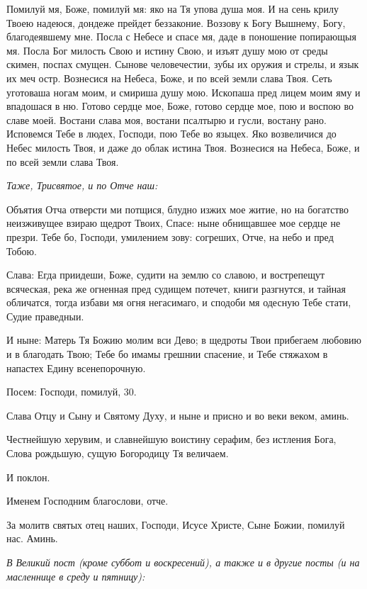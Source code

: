

Помилуй мя, Боже, помилуй мя: яко на Тя упова душа моя. И на сень крилу Твоею надеюся, дондеже прейдет беззаконие. Воззову к Богу Вышнему, Богу, благодеявшему мне. Посла с Небесе и спасе мя, даде в поношение попирающыя мя. Посла Бог милость Свою и истину Свою, и изъят душу мою от среды скимен, поспах смущен. Сынове человечестии, зубы их оружия и стрелы, и язык их меч остр. Вознесися на Небеса, Боже, и по всей земли слава Твоя. Сеть уготоваша ногам моим, и смириша душу мою. Ископаша пред лицем моим яму и впадошася в ню. Готово сердце мое, Боже, готово сердце мое, пою и воспою во славе моей. Востани слава моя, востани псалтырю и гусли, востану рано. Исповемся Тебе в людех, Господи, пою Тебе во языцех. Яко возвеличися до Небес милость Твоя, и даже до облак истина Твоя. Вознесися на Небеса, Боже, и по всей земли слава Твоя.


\itshape Таже, Трисвятое, и по Отче наш:\normalfont{}




Объятия Отча отверсти ми потщися, блудно изжих мое житие, но на богатство неизживущее взираю щедрот Твоих, Спасе: ныне обнищавшее мое сердце не презри. Тебе бо, Господи, умилением зову: согреших, Отче, на небо и пред Тобою.


Слава: Егда приидеши, Боже, судити на землю со славою, и вострепещут всяческая, река же огненная пред судищем потечет, книги разгнутся, и тайная обличатся, тогда избави мя огня негасимаго, и сподоби мя одесную Тебе стати, Судие праведныи.


И ныне: Матерь Тя Божию молим вси Дево; в щедроты Твои прибегаем любовию и в благодать Твою; Тебе бо имамы грешнии спасение, и Тебе стяжахом в напастех Едину всенепорочную.


Посем: Господи, помилуй, 30.

Слава Отцу и Сыну и Святому Духу, и ныне и присно и во веки веком, аминь.

Честнейшую херувим, и славнейшую воистину серафим, без истления Бога, Слова рождьшую, сущую Богородицу Тя величаем.

И поклон.

Именем Господним благослови, отче.

За молитв святых отец наших, Господи, Исусе Христе, Сыне Божии, помилуй нас. Аминь.


\itshape В Великий пост (кроме суббот и воскресений), а также и в другие посты (и на масленнице в среду и пятницу):\normalfont{}


